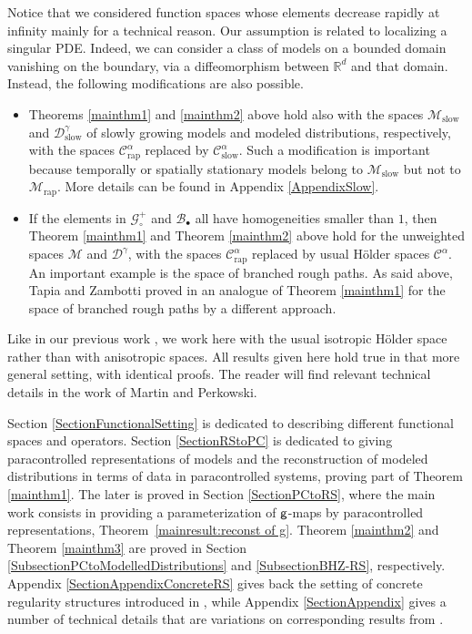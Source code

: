 \documentclass[10pt]{amsart}
\newcommand{\sbullet}{{\scriptscriptstyle\bullet}}
\theoremstyle{plain}
\theoremstyle{definition}
\newcommand{\rap}{\mathrm{rap}}
\newcommand{\slow}{\mathrm{slow}}
\newcommand{\scrM}{\mathscr{M}}
\newcommand{\mcB}{\mathcal{B}}
\newcommand{\mcC}{\mathcal{C}}
\newcommand{\mcD}{\mathcal{D}}
\newcommand{\mcG}{\mathcal{G}}
\begin{document}
Notice that we considered function spaces whose elements decrease rapidly at infinity mainly for a technical reason. Our assumption is related to localizing a singular PDE. Indeed, we can consider a class of models on a bounded domain vanishing on the boundary, via a diffeomorphism between $\mathbb{R}^d$ and that domain. Instead, the following modifications are also possible.
\begin{itemize}
\item Theorems \ref{mainthm1} and \ref{mainthm2} above hold also with the spaces $\scrM_{\slow}$ and $\mcD_{\slow}^\gamma$ of slowly growing models and modeled distributions, respectively, with the spaces $\mcC_{\rap}^\alpha$ replaced by $\mcC_{\slow}^\alpha$. Such a modification is important because temporally or spatially stationary models belong to $\scrM_{\slow}$ but not to $\scrM_{\rap}$. More details can be found in Appendix \ref{AppendixSlow}.

\item If the elements in $\mcG_\circ^+$ and $\mcB_\sbullet$ all have homogeneities smaller than $1$, then Theorem \ref{mainthm1} and Theorem \ref{mainthm2} above hold for the unweighted spaces $\scrM$ and $\mcD^\gamma$, with the spaces $\mcC_{\rap}^\alpha$ replaced by usual Hölder spaces $\mcC^\alpha$. An important example is the space of branched rough paths. As said above, Tapia and Zambotti proved in \cite{TZ18} an analogue of Theorem \ref{mainthm1} for the space of branched rough paths by a different approach.
\end{itemize}

Like in our previous work \cite{BH}, we work here with the usual isotropic Hölder space rather than with anisotropic spaces. All results given here hold true in that more general setting, with identical proofs. The reader will find relevant technical details in the work \cite{MP18} of Martin and Perkowski.\enlargethispage{.5\baselineskip}%

Section \ref{SectionFunctionalSetting} is dedicated to describing different functional spaces and operators. Section \ref{SectionRStoPC} is dedicated to giving paracontrolled representations of models and the recons\-truction of modeled distributions in terms of data in paracontrolled systems, proving part of Theorem \ref{mainthm1}. The later is proved in Section \ref{SectionPCtoRS}, where the main work consists in providing a parameterization of $\sf g$-maps by paracontrolled representations, Theorem~\ref{mainresult:reconst of g}. Theorem \ref{mainthm2} and Theorem \ref{mainthm3} are proved in Section \ref{SubsectionPCtoModelledDistributions} and \ref{SubsectionBHZ-RS}, respectively. Appendix \ref{SectionAppendixConcreteRS} gives back the setting of concrete regularity structures introduced in \cite{BH}, while Appendix \ref{SectionAppendix} gives a number of technical details that are variations on corresponding results from \cite{BH}.
\end{document}
